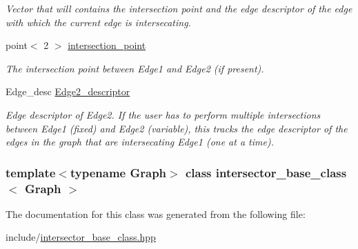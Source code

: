 \begin{DoxyCompactItemize}
\begin{DoxyCompactList}\small\item\em Vector that will contains the intersection point and the edge descriptor of the edge with which the current edge is intersecating. \item\end{DoxyCompactList}\item 
\hypertarget{classintersector__base__class_a13c90acea49e8fef960046229a68e8b6}{
point$<$ 2 $>$ \hyperlink{classintersector__base__class_a13c90acea49e8fef960046229a68e8b6}{intersection\_\-point}}
\label{classintersector__base__class_a13c90acea49e8fef960046229a68e8b6}

\begin{DoxyCompactList}\small\item\em The intersection point between Edge1 and Edge2 (if present). \item\end{DoxyCompactList}\item 
\hypertarget{classintersector__base__class_a87fabe1d84ba485f04a46d5202e7bf23}{
Edge\_\-desc \hyperlink{classintersector__base__class_a87fabe1d84ba485f04a46d5202e7bf23}{Edge2\_\-descriptor}}
\label{classintersector__base__class_a87fabe1d84ba485f04a46d5202e7bf23}

\begin{DoxyCompactList}\small\item\em Edge descriptor of Edge2.  If the user has to perform multiple intersections between Edge1 (fixed) and Edge2 (variable), this tracks the edge descriptor of the edges in the graph that are intersecating Edge1 (one at a time). \item\end{DoxyCompactList}\end{DoxyCompactItemize}
\subsubsection*{template$<$typename Graph$>$ class intersector\_\-base\_\-class$<$ Graph $>$}



The documentation for this class was generated from the following file:\begin{DoxyCompactItemize}
\item 
include/\hyperlink{intersector__base__class_8hpp}{intersector\_\-base\_\-class.hpp}\end{DoxyCompactItemize}
